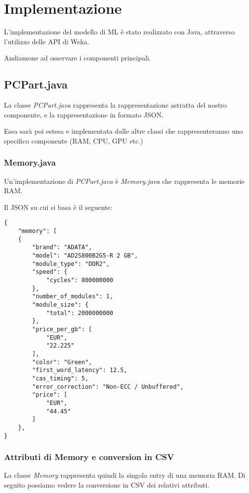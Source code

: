\documentclass[12pt]{report}
\begin{document}
\newpage
\section{Implementazione}
L'implementazione del modello di ML è stato realizzato con Java, attraverso l'utilizzo delle API di Weka.

Andiamone ad osservare i componenti principali.

\subsection{PCPart.java}

La classe \textit{PCPart.java} rappresenta la rappresentazione astratta del nostro componente, e
la rappresentazione in formato JSON.

Essa sarà poi estesa e implementata dalle altre classi che rappresenteranno uno specifico componente
(RAM, CPU, GPU etc.)



\newpage
\subsubsection{Memory.java}

Un'implementazione di \textit{PCPart.java} è \textit{Memory.java} che rappresenta le memorie RAM.

Il JSON su cui si basa è il seguente:
\begin{lstlisting}
{
	"memory": [
	{
		"brand": "ADATA",
		"model": "AD2S800B2G5-R 2 GB",
		"module_type": "DDR2",
		"speed": {
			"cycles": 800000000
		},
		"number_of_modules": 1,
		"module_size": {
			"total": 2000000000
		},
		"price_per_gb": [
			"EUR",
			"22.225"
		],
		"color": "Green",
		"first_word_latency": 12.5,
		"cas_timing": 5,
		"error_correction": "Non-ECC / Unbuffered",
		"price": [
			"EUR",
			"44.45"
		]
	},
}
\end{lstlisting}

\newpage

\subsubsection{Attributi di Memory e conversion in CSV}

La classe \textit{Memory} rappresenta quindi la singola entry di una memoria RAM. Di seguito possiamo 
vedere la conversione in CSV dei relativi attributi.
\end{document}
